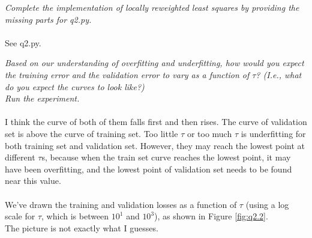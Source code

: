 \documentclass{myhw}
\begin{document}
\begin{homeworkProblem}
\begin{homeworkSection}
\end{homeworkSection}
\begin{homeworkSection}
\emph{Complete the implementation of locally reweighted least squares by providing the missing parts for q2.py. }\\
\\
See q2.py.
\end{homeworkSection}
\begin{homeworkSection}
\emph{Based on our understanding of overfitting and underfitting, how would you expect the training error and the validation error to vary as a function of $\tau$? (I.e., what do you expect the curves to look like?) \\
Run the experiment. }\\
\\
I think the curve of both of them falls first and then rises. 
The curve of validation set is above the curve of training set.
Too little $\tau$ or too much $\tau$ is underfitting for both training set and validation set.
However, they may reach the lowest point at different $\tau$s, because when the train set curve reaches the lowest point, it may have been overfitting, and the lowest point of validation set needs to be found near this value. \\
\\
We've drawn the training and validation losses as a function of $\tau$ (using a log scale for $\tau$, which is between $10^{1}$ and $10^3$), as shown in Figure \ref{fig:q2.2}. \\
The picture is not exactly what I guesses.

\end{homeworkSection}
\end{homeworkProblem}
\end{document}

